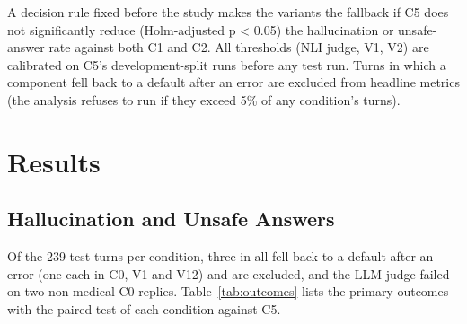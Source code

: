 \documentclass[conference]{IEEEtran}
\begin{document}
A decision rule fixed before the study makes the variants the fallback if C5 does not significantly reduce (Holm-adjusted p \textless{} 0.05) the hallucination or unsafe-answer rate against both C1 and C2. All thresholds (NLI judge, V1, V2) are calibrated on C5's development-split runs before any test run. Turns in which a component fell back to a default after an error are excluded from headline metrics (the analysis refuses to run if they exceed 5\% of any condition's turns).

\section{Results}\label{sec:results}

\subsection{Hallucination and Unsafe Answers}

Of the 239 test turns per condition, three in all fell back to a default after an error (one each in C0, V1 and V12) and are excluded, and the LLM judge failed on two non-medical C0 replies. Table~\ref{tab:outcomes} lists the primary outcomes with the paired test of each condition against C5.
\end{document}
